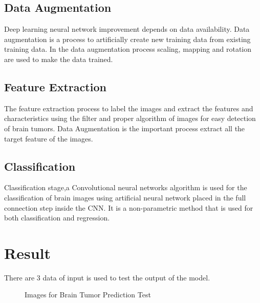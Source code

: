 \documentclass[conference]{IEEEtran}
\begin{document}
\subsection{Data Augmentation}

Deep learning neural network improvement depends on data availability. Data augmentation is a process to artificially create new training data from existing training data. In the data augmentation process scaling, mapping and rotation are used to make the data trained. 

\subsection{Feature Extraction}
The feature extraction process to label the images and extract the features and characteristics using the filter and proper algorithm of images for easy detection of brain tumors. Data Augmentation is the important process extract all the target feature of the images.\cite{b2}

\subsection{Classification}
Classification stage,a Convolutional neural networks algorithm is used for the classification of brain images using artificial neural network placed in the full connection step inside the CNN. It is a non-parametric method that is used for both classification and regression.\cite{b4}


\section{Result}
There are 3 data of input is used to test the output of the model.

\begin{figure} [htb]
\centering 
{}\hfill
{} \hfill
{}\hfill
\caption{\label{fig:samplesetup}Images for Brain Tumor Prediction Test}
\end{figure}
\end{document}
